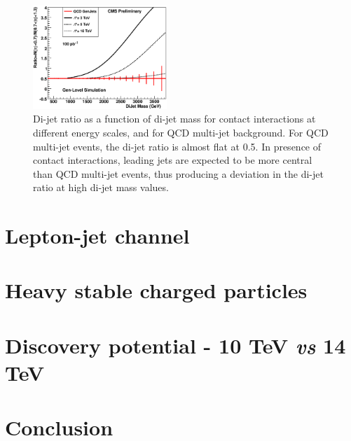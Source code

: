 \documentclass{cimento}
\begin{document}
\begin{figure}[htbp] 
\centering
\includegraphics[width=0.45\textwidth]{./DiJetRatio100pbOptFix.eps} 
\caption{Di-jet ratio as a function of di-jet mass for contact interactions at 
different energy scales, and for QCD multi-jet background. 
For QCD multi-jet events, the di-jet ratio is almost flat at 0.5. 
In presence of contact interactions, 
leading jets are expected to be more central than QCD multi-jet events, 
thus producing a deviation in the di-jet ratio at high di-jet mass values.}
\label{fig:DiJetRatio}
\end{figure}

\section{Lepton-jet channel} \label{leptonjet}

\section{Heavy stable charged particles} \label{HSCP}

\section{Discovery potential - 10 TeV {\it vs} 14 TeV} \label{10TeVvs14TeV}

\section{Conclusion} \label{Conclusion}











\end{document}

